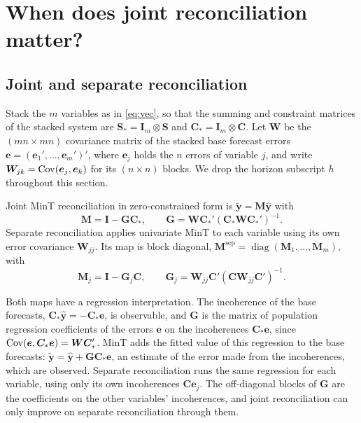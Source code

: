 
\section{When does joint reconciliation matter?}
\label{sec:theory}

\subsection{Joint and separate reconciliation}

Stack the $m$ variables as in \eqref{eq:vec}, so that the summing and constraint matrices of the stacked system are $\bm{S}_* = \bm{I}_m \otimes \bm{S}$ and $\bm{C}_* = \bm{I}_m \otimes \bm{C}$. Let $\bm{W}$ be the $(mn \times mn)$ covariance matrix of the stacked base forecast errors $\bm{e} = (\bm{e}_1', \dots, \bm{e}_m')'$, where $\bm{e}_j$ holds the $n$ errors of variable $j$, and write $\bm{W}_{jk} = \operatorname{Cov}(\bm{e}_j, \bm{e}_k)$ for its $(n \times n)$ blocks. We drop the horizon subscript $h$ throughout this section.

Joint MinT reconciliation in zero-constrained form \citep{di2023cross} is $\widetilde{\bm{y}} = \bm{M}\widehat{\bm{y}}$ with
\begin{equation}\label{eq:joint-map}
  \bm{M} = \bm{I} - \bm{G}\bm{C}_*,
  \qquad
  \bm{G} = \bm{W}\bm{C}_*'(\bm{C}_*\bm{W}\bm{C}_*')^{-1}.
\end{equation}
Separate reconciliation applies univariate MinT to each variable using its own error covariance $\bm{W}_{jj}$. Its map is block diagonal, $\bm{M}^{\mathrm{sep}} = \operatorname{diag}(\bm{M}_1, \dots, \bm{M}_m)$, with
\begin{equation}\label{eq:sep-map}
  \bm{M}_j = \bm{I} - \bm{G}_j\bm{C},
  \qquad
  \bm{G}_j = \bm{W}_{jj}\bm{C}'(\bm{C}\bm{W}_{jj}\bm{C}')^{-1}.
\end{equation}

Both maps have a regression interpretation. The incoherence of the base forecasts, $\bm{C}_*\widehat{\bm{y}} = -\bm{C}_*\bm{e}$, is observable, and $\bm{G}$ is the matrix of population regression coefficients of the errors $\bm{e}$ on the incoherences $\bm{C}_*\bm{e}$, since $\operatorname{Cov}(\bm{e}, \bm{C}_*\bm{e}) = \bm{W}\bm{C}_*'$. MinT adds the fitted value of this regression to the base forecasts: $\widetilde{\bm{y}} = \widehat{\bm{y}} + \bm{G}\bm{C}_*\bm{e}$, an estimate of the error made from the incoherences, which are observed. Separate reconciliation runs the same regression for each variable, using only its own incoherences $\bm{C}\bm{e}_j$. The off-diagonal blocks of $\bm{G}$ are the coefficients on the other variables' incoherences, and joint reconciliation can only improve on separate reconciliation through them.

